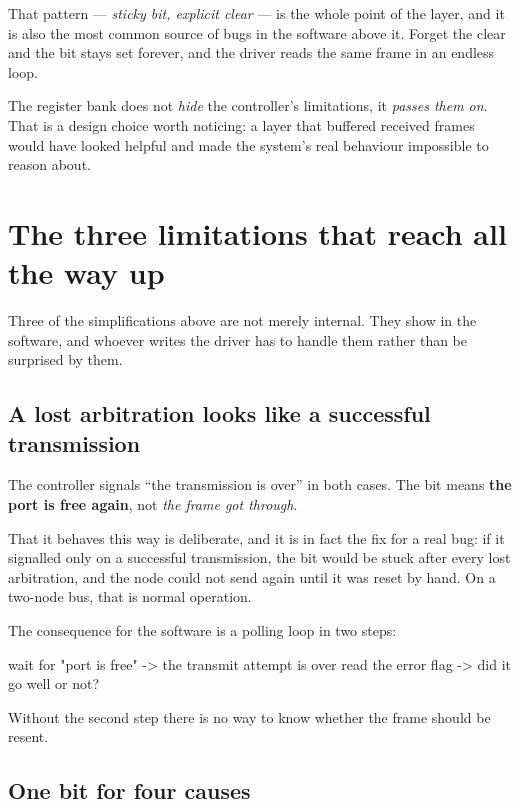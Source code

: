 That pattern --- \emph{sticky bit, explicit clear} --- is the whole point of the layer, and it is
also the most common source of bugs in the software above it. Forget the clear and the bit stays set
forever, and the driver reads the same frame in an endless loop.

\begin{aside}
\note The register bank does not \emph{hide} the controller's limitations, it \emph{passes them on}.
That is a design choice worth noticing: a layer that buffered received frames would have looked
helpful and made the system's real behaviour impossible to reason about.
\end{aside}

\section{The three limitations that reach all the way up}

Three of the simplifications above are not merely internal. They show in the software, and whoever
writes the driver has to handle them rather than be surprised by them.

\subsection{A lost arbitration looks like a successful transmission}

The controller signals ``the transmission is over'' in both cases. The bit means \textbf{the port is
free again}, not \emph{the frame got through}.

That it behaves this way is deliberate, and it is in fact the fix for a real bug: if it signalled
only on a successful transmission, the bit would be stuck after every lost arbitration, and the
node could not send again until it was reset by hand. On a two-node bus, that is normal
operation.

The consequence for the software is a polling loop in two steps:

\begin{console}
wait for "port is free"   -> the transmit attempt is over
read the error flag       -> did it go well or not?
\end{console}

Without the second step there is no way to know whether the frame should be resent.

\subsection{One bit for four causes}

